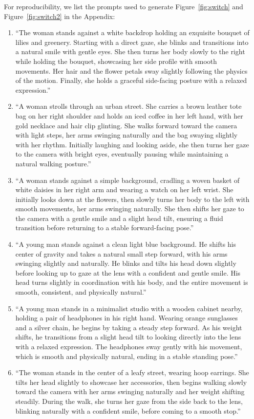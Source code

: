 For reproducibility, we list the prompts used to generate Figure~\ref{fig:switch} and Figure~\ref{fig:switch2} in the Appendix:
\begin{enumerate}
\item ``The woman stands against a white backdrop holding an exquisite bouquet of lilies and greenery. Starting with a direct gaze, she blinks and transitions into a natural smile with gentle eyes. She then turns her body slowly to the right while holding the bouquet, showcasing her side profile with smooth movements. Her hair and the flower petals sway slightly following the physics of the motion. Finally, she holds a graceful side-facing posture with a relaxed expression.''
% 
\item ``A woman strolls through an urban street. She carries a brown leather tote bag on her right shoulder and holds an iced coffee in her left hand, with her gold necklace and hair clip glinting. She walks forward toward the camera with light steps, her arms swinging naturally and the bag swaying slightly with her rhythm. Initially laughing and looking aside, she then turns her gaze to the camera with bright eyes, eventually pausing while maintaining a natural walking posture.''
% 
\item ``A woman stands against a simple background, cradling a woven basket of white daisies in her right arm and wearing a watch on her left wrist. She initially looks down at the flowers, then slowly turns her body to the left with smooth movements, her arms swinging naturally. She then shifts her gaze to the camera with a gentle smile and a slight head tilt, ensuring a fluid transition before returning to a stable forward-facing pose.''
% 
\item ``A young man stands against a clean light blue background. He shifts his center of gravity and takes a natural small step forward, with his arms swinging slightly and naturally. He blinks and tilts his head down slightly before looking up to gaze at the lens with a confident and gentle smile. His head turns slightly in coordination with his body, and the entire movement is smooth, consistent, and physically natural.''
% 
\item ``A young man stands in a minimalist studio with a wooden cabinet nearby, holding a pair of headphones in his right hand. Wearing orange sunglasses and a silver chain, he begins by taking a steady step forward. As his weight shifts, he transitions from a slight head tilt to looking directly into the lens with a relaxed expression. The headphones sway gently with his movement, which is smooth and physically natural, ending in a stable standing pose.''
% 
\item ``The woman stands in the center of a leafy street, wearing hoop earrings. She tilts her head slightly to showcase her accessories, then begins walking slowly toward the camera with her arms swinging naturally and her weight shifting steadily. During the walk, she turns her gaze from the side back to the lens, blinking naturally with a confident smile, before coming to a smooth stop.''
\end{enumerate}



